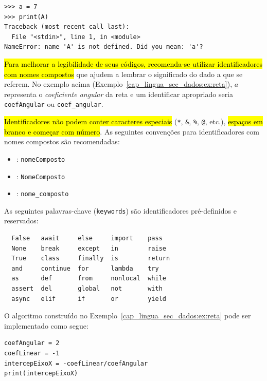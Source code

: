 \begin{lstlisting}
>>> a = 7
>>> print(A)
Traceback (most recent call last):
  File "<stdin>", line 1, in <module>
NameError: name 'A' is not defined. Did you mean: 'a'?
\end{lstlisting}

\hl{Para melhorar a legibilidade de seus códigos, recomenda-se utilizar identificadores com nomes compostos} que ajudem a lembrar o significado do dado a que se referem. No exemplo acima (Exemplo~\ref{cap_lingua_sec_dados:ex:reta}), $a$ representa o \emph{coeficiente angular} da reta e um identificar apropriado seria \texttt{coefAngular} ou \texttt{coef\_angular}.

\hl{Identificadores não podem conter caracteres especiais} (\lstinline+*+, \lstinline+&+, \lstinline+%+,
\lstinline+@+, etc.), \hl{espaços em branco e começar com número}. As seguintes convenções para identificadores com nomes compostos são recomendadas:
\begin{itemize}
\item {}: \texttt{nomeComposto}
\item {}: \texttt{NomeComposto}
\item {}: \texttt{nome\_composto}
\end{itemize}

\begin{obs}
  As seguintes palavras-chave (\texttt{keywords}) são identificadores pré-definidos e reservados:

\begin{verbatim}
  False   await     else     import    pass
  None    break     except   in        raise
  True    class     finally  is        return
  and     continue  for      lambda    try
  as      def       from     nonlocal  while
  assert  del       global   not       with
  async   elif      if       or        yield
\end{verbatim}

\end{obs}

\begin{ex}
  O algoritmo construído no Exemplo~\ref{cap_lingua_sec_dados:ex:reta} pode ser implementado como segue:

\begin{lstlisting}
coefAngular = 2
coefLinear = -1
intercepEixoX = -coefLinear/coefAngular
print(intercepEixoX)
\end{lstlisting}

\end{ex}

